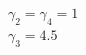 \documentclass[preview]{standalone}
\begin{document}
\begin{center}
$\gamma_2 = \gamma_4 = 1$\\$\gamma_3 = 4.5$
\end{center}
\end{document}
